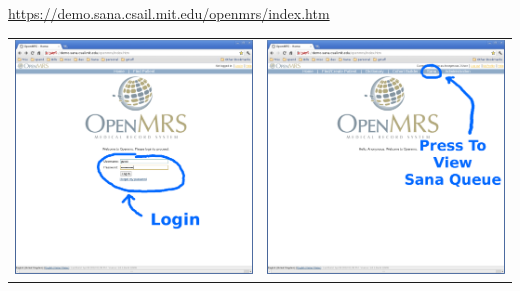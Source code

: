 \documentclass[a4paper,10pt]{article}
\begin{document}
\begin{center}
\url{https://demo.sana.csail.mit.edu/openmrs/index.htm}
\end{center}

\begin{flushleft}
\begin{tabular}{ c c }
\includegraphics[scale=0.23,keepaspectratio=true]{openmrs_login.png}
&\includegraphics[scale=0.23,keepaspectratio=true]{openmrs_login_success_sana_tab.png}
\end{tabular}
\end{flushleft}
\end{document}
